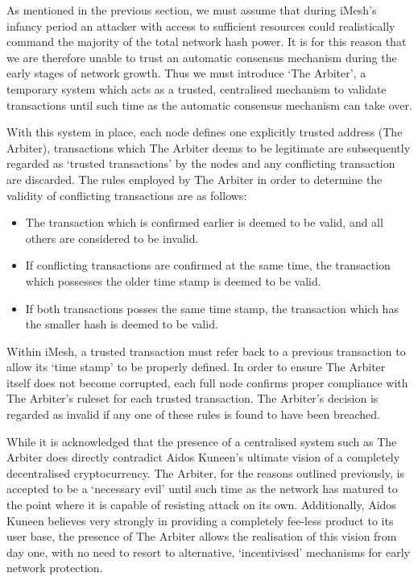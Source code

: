 \documentclass[a4paper,10pt,twocolumn]{article}
\begin{document}
As mentioned in the previous section, we must assume that during iMesh's infancy period an attacker with access to sufficient resources 
could realistically command the majority of the total network hash power. It is for this reason that we are therefore unable to trust an 
automatic consensus mechanism during the early stages of network growth. Thus we must introduce `The Arbiter', a temporary system which 
acts as a trusted, centralised mechanism to validate transactions until such time as the automatic consensus mechanism can take over.

With this system in place, each node defines one explicitly trusted address (The Arbiter), transactions which The Arbiter deems to be 
legitimate are subsequently regarded as `trusted transactions' by the nodes and any conflicting transaction are discarded. The rules 
employed by The Arbiter in order to determine the validity of conflicting transactions are as follows:

\begin{itemize}
	\item The transaction which is confirmed earlier is deemed to be valid, and all others are considered to be invalid.
	\item If conflicting transactions are confirmed at the same time, the transaction which possesses the older time stamp is deemed 
	to be valid.
	\item If both transactions posses the same time stamp, the transaction which has the smaller hash
	is deemed to be valid.
\end{itemize}

Within iMesh, a trusted transaction must refer back to a previous transaction to allow its `time stamp' to be properly defined.
In order to ensure The Arbiter itself does not become corrupted, each full node confirms proper compliance with The Arbiter's ruleset for each trusted transaction. The Arbiter's decision is regarded as invalid if any one of these rules is found to have been breached.

While it is acknowledged that the presence of a centralised system such as The Arbiter does directly contradict Aidos Kuneen's ultimate 
vision of a completely decentralised cryptocurrency. The Arbiter, for the reasons outlined previously, is accepted to be a
`necessary evil' until such time as the network has matured to the point where it is capable of resisting attack on its own. 
Additionally, Aidos Kuneen believes very strongly in providing a completely fee-less product to its user base, the presence of The Arbiter allows the realisation of this vision from day one, with no need to resort to alternative, `incentivised' mechanisms for early network protection.
\end{document}
